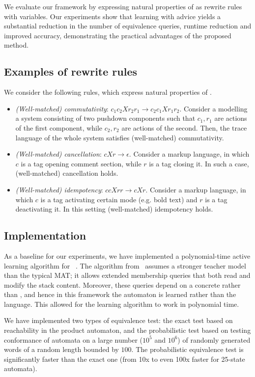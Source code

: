 We evaluate our framework by expressing natural properties of \VPLs as rewrite rules with variables. 
Our experiments show that learning with advice yields 
a substantial reduction in the number of equivalence queries, runtime reduction and improved accuracy,
demonstrating the practical advantages of the proposed method.    

\subsection{Examples of rewrite rules}
We consider the following rules, which express natural properties of \VPLs.
\begin{itemize}
\item \emph{(Well-matched) commutativity}: $c_1 c_2 X r_2 r_1 \to c_2 c_1 X r_1 r_2$. Consider a \DVPA 
modelling a system consisting of two pushdown components such that $c_1, r_1$ are actions of the first component,
while $c_2, r_2$ are actions of the second. Then, the trace language of the whole system satisfies 
(well-matched) commutativity.
\item \emph{(Well-matched) cancellation}: $c X r \to \epsilon$. Consider a markup language, in which $c$ is a tag opening comment section,
while $r$ is a tag closing it. In such a case, (well-matched) cancellation holds.
\item \emph{(Well-matched) idempotency}: $c c X r r \to c X r$. Consider a markup language, in which $c$ is a tag activating certain mode 
(e.g. bold text) and $r$ is a tag deactivating it. In this setting (well-matched) idempotency holds.
\end{itemize}


\subsection{Implementation}

As a baseline for our experiments, we have implemented a polynomial-time active learning algorithm for \DVPA~\cite{mfcs22}.
The algorithm from~\cite{mfcs22} assumes a stronger teacher model than the typical MAT; it allows extended membership queries
that both read and modify the stack content. Moreover, these queries depend on a concrete \DVPA rather than \VPL, and hence
in this framework the automaton is learned rather than the language. This allowed for
 the learning algorithm to work in polynomial time. 

We have implemented two types of equivalence test: the exact test based on reachability in the product automaton, and
the probabilistic test based on testing conformance of automata on a large number ($10^5$ and $10^6$) of randomly generated words
of a random length bounded by $100$.
The probabilistic equivalence test is significantly faster than the exact one (from 10x to even 100x faster for 25-state automata).


